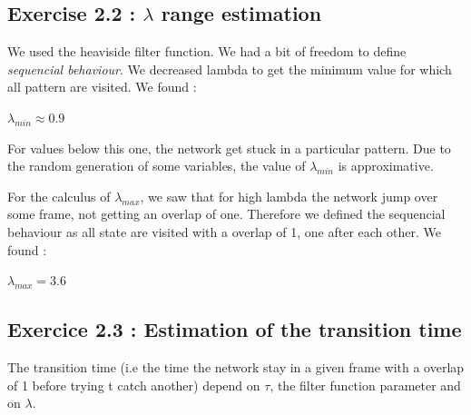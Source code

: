 \subsection{Exercise 2.2 : $\lambda$ range estimation}
We used the heaviside filter function. We had a bit
of freedom to define {\it sequencial behaviour}. We decreased lambda to get the minimum value
for which all pattern are visited. We found :
\begin{center}
$\lambda_{min} \approx 0.9$
\end{center}
For values below this one, the network get stuck in a particular pattern. Due to the random generation
of some variables, the value of $\lambda_{min}$ is approximative.


For the calculus of $\lambda_{max}$, we saw that for high lambda the network jump over some frame, not
getting an overlap of one. Therefore we defined the sequencial behaviour as all state are visited with a overlap of 1, 
one after each other.
We found :
\begin{center}
$\lambda_{max} = 3.6$
\end{center}

\subsection{Exercice 2.3 : Estimation of the transition time}
The transition time (i.e the time the network stay in a given frame with a overlap of 1
before trying t catch another) depend on $\tau$, the filter function parameter and 
on $\lambda$.

